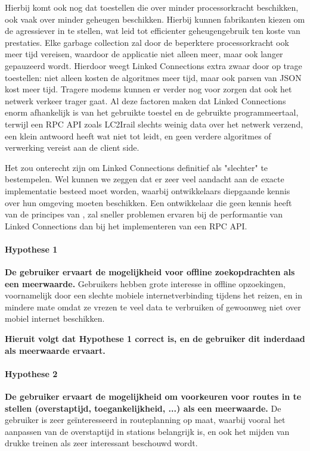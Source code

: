 Hierbij komt ook nog dat toestellen die over minder processorkracht beschikken, ook vaak over minder geheugen beschikken. Hierbij kunnen fabrikanten kiezen om de  agressiever in te stellen, wat leid tot efficienter geheugengebruik ten koste van prestaties. %
Elke garbage collection zal door de beperktere processorkracht ook meer tijd vereisen, waardoor de applicatie niet alleen meer, maar ook langer gepauzeerd wordt. Hierdoor weegt Linked Connections extra zwaar door op trage toestellen: niet alleen kosten de algoritmes meer tijd, maar ook parsen van JSON kost meer tijd. Tragere modems kunnen er verder nog voor zorgen dat ook het netwerk verkeer trager gaat. Al deze factoren maken dat Linked Connections enorm afhankelijk is van het gebruikte toestel en de gebruikte programmeertaal, terwijl een RPC API zoals LC2Irail slechts weinig data over het netwerk verzend, een klein antwoord heeft wat niet tot  leidt, en geen verdere algoritmes of verwerking vereist aan de client side. 

Het zou onterecht zijn om Linked Connections definitief als "slechter" te bestempelen. Wel kunnen we zeggen dat er zeer veel aandacht aan de exacte implementatie besteed moet worden, waarbij ontwikkelaars diepgaande kennis over hun omgeving moeten beschikken. Een ontwikkelaar die geen kennis heeft van de principes van , zal sneller problemen ervaren bij de performantie van Linked Connections dan bij het implementeren van een RPC API.

\paragraph{Hypothese 1} \textbf{De gebruiker ervaart de mogelijkheid voor offline zoekopdrachten als een meerwaarde.}
	Gebruikers hebben grote interesse in offline opzoekingen, voornamelijk door een slechte mobiele internetverbinding tijdens het reizen, en in mindere mate omdat ze vrezen te veel data te verbruiken of gewoonweg niet over mobiel internet beschikken.
	
\textbf{Hieruit volgt dat Hypothese 1 correct is, en de gebruiker dit inderdaad als meerwaarde ervaart.
}
\paragraph{Hypothese 2}\textbf{De gebruiker ervaart de mogelijkheid om voorkeuren voor routes in te stellen (overstaptijd, toegankelijkheid, ...) als een meerwaarde.}
	De gebruiker is zeer geïnteresseerd in routeplanning op maat, waarbij vooral het aanpassen van de overstaptijd in stations belangrijk is, en ook het mijden van drukke treinen als zeer interessant beschouwd wordt.

